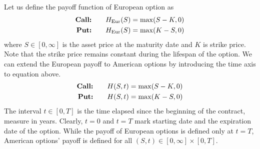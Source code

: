 Let us define the payoff function of European option as
\begin{subequations}
  \begin{align}
    \text{\textbf{Call:}} \qquad H_{\text{Eur}}(S) = \max(S - K, 0) \\
    \text{\textbf{Put:}} \qquad H_{\text{Eur}}(S) = \max(K - S, 0)
  \end{align}
  \label{eq:blackscholes:preliminaries:european_put_payoff}
\end{subequations}
where $S \in [0, \infty]$ is the asset price at the maturity date and $K$ is strike price. Note that the strike price remains constant during the lifespan of the option. We can extend the European payoff to American options by introducing the time axis to equation above.
\begin{subequations}
  \begin{align}
    \text{\textbf{Call:}} \qquad H(S, t) = \max(S - K, 0) \\
    \text{\textbf{Put:}} \qquad H(S,t) = \max(K - S, 0)
  \end{align}
  \label{eq:blackscholes:preliminaries:american_put_payoff}
\end{subequations}
The interval $t\in[0, T]$ is the time elapsed since the beginning of the contract, measure in years. Clearly, $t=0$ and $t=T$ mark starting date and  the expiration date of the option. While the payoff of European options is defined only at $t=T$, American options' payoff is defined for all $(S, t) \in [0, \infty]\times[0, T]$.


